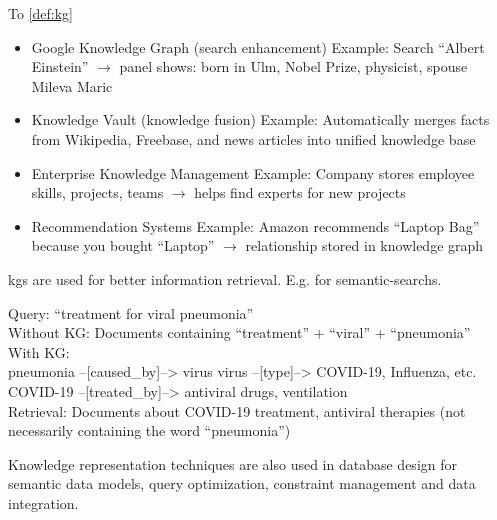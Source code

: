 \begin{bsp}
    To \autoref{def:kg} \\
    \begin{itemize}
        \item Google Knowledge Graph (search enhancement) Example: Search “Albert
        Einstein” $\rightarrow$ panel shows: born in Ulm, Nobel Prize, physicist, spouse Mileva Maric
        \item Knowledge Vault (knowledge fusion) Example: Automatically merges facts
        from Wikipedia, Freebase, and news articles into unified knowledge base
        \item Enterprise Knowledge Management Example: Company stores employee skills,
        projects, teams $\rightarrow$ helps find experts for new projects
        \item Recommendation Systems Example: Amazon recommends “Laptop Bag”
        because you bought “Laptop” $\rightarrow$ relationship stored in knowledge graph
    \end{itemize}
\end{bsp}


\Glspl{kg} are used for better information retrieval.
E.g. for \glspl{semantic-search}.

\begin{bsp}
    Query: ``treatment for viral pneumonia'' \\
    Without KG: Documents containing ``treatment'' + ``viral'' + ``pneumonia'' \\
    With KG: \\
    pneumonia --[caused\_by]--> virus
    virus --[type]--> COVID-19, Influenza, etc.
    COVID-19 --[treated\_by]--> antiviral drugs, ventilation \\
    Retrieval: Documents about COVID-19 treatment, antiviral therapies
    (not necessarily containing the word ``pneumonia'')
\end{bsp}

Knowledge representation techniques are also used in database design for semantic data models, query optimization,
constraint management and data integration.

